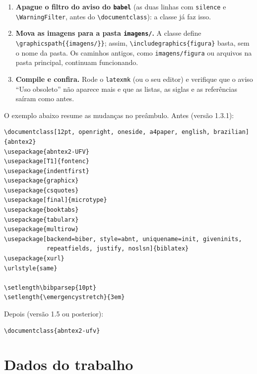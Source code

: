 \begin{enumerate}
        e o \texttt{\textbackslash setlength\{\textbackslash emergencystretch\}}. Mantenha o
        \texttt{\textbackslash addbibresource}. Se você usa opções diferentes das do
        modelo, use a opção \texttt{nobiblatex} e mantenha o seu próprio carregamento.
  \item \textbf{Apague o filtro do aviso do \texttt{babel}} (as duas linhas com
        \texttt{silence} e \texttt{\textbackslash WarningFilter}, antes do
        \texttt{\textbackslash documentclass}): a classe já faz isso.
  \item \textbf{Mova as imagens para a pasta \texttt{imagens/}.} A classe define
        \texttt{\textbackslash graphicspath\allowbreak\{\{imagens/\}\}}; assim,
        \texttt{\textbackslash includegraphics\{figura\}} basta, sem o nome da pasta. Os
        caminhos antigos, como \texttt{imagens/figura} ou arquivos na pasta principal,
        continuam funcionando.
  \item \textbf{Compile e confira.} Rode o \texttt{latexmk} (ou o seu editor) e verifique
        que o aviso ``Uso obsoleto'' não aparece mais e que as listas, as siglas e as
        referências saíram como antes.
\end{enumerate}

O exemplo abaixo resume as mudanças no preâmbulo. Antes (versão 1.3.1):

\begin{lstlisting}[style=exemplo, language={[LaTeX]TeX}]
\documentclass[12pt, openright, oneside, a4paper, english, brazilian]{abntex2}
\usepackage{abntex2-UFV}
\usepackage[T1]{fontenc}
\usepackage{indentfirst}
\usepackage{graphicx}
\usepackage{csquotes}
\usepackage[final]{microtype}
\usepackage{booktabs}
\usepackage{tabularx}
\usepackage{multirow}
\usepackage[backend=biber, style=abnt, uniquename=init, giveninits,
            repeatfields, justify, noslsn]{biblatex}
\usepackage{xurl}
\urlstyle{same}

\setlength\bibparsep{10pt}
\setlength{\emergencystretch}{3em}
\end{lstlisting}
Depois (versão 1.5 ou posterior):

\begin{lstlisting}[style=exemplo, language={[LaTeX]TeX}]
\documentclass{abntex2-ufv}

\end{lstlisting}

\section{Dados do trabalho}

